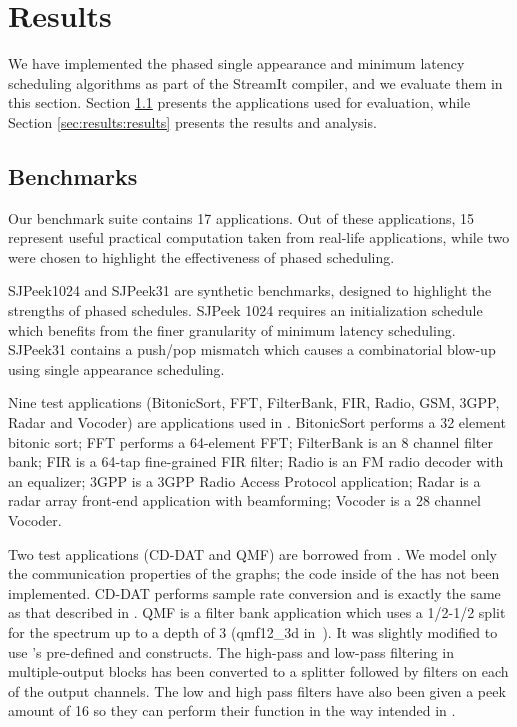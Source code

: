 \section{Results}
\label{chpt:results}

We have implemented the phased single appearance and minimum latency
scheduling algorithms as part of the StreamIt compiler, and we
evaluate them in this section.  Section \ref{sec:results:apps}
presents the applications used for evaluation, while Section
\ref{sec:results:results} presents the results and analysis.

\subsection{Benchmarks}
\label{sec:results:apps}

Our benchmark suite contains 17 applications. Out of these
applications, 15 represent useful practical computation taken from
real-life applications, while two were chosen to highlight the
effectiveness of phased scheduling.

SJPeek1024 and SJPeek31 are synthetic benchmarks, designed to
highlight the strengths of phased schedules.  SJPeek 1024 requires an
initialization schedule which benefits from the finer granularity of
minimum latency scheduling. SJPeek31 contains a push/pop mismatch
which causes a combinatorial blow-up using single appearance
scheduling.

Nine test applications (BitonicSort, FFT, FilterBank, FIR, Radio, GSM,
3GPP, Radar and Vocoder) are applications used in
\cite{Gordo02}. BitonicSort performs a 32 element bitonic sort; FFT
performs a 64-element FFT; FilterBank is an 8 channel filter bank; FIR
is a 64-tap fine-grained FIR filter; Radio is an FM radio decoder with
an equalizer; 3GPP is a 3GPP Radio Access Protocol application; Radar
is a radar array front-end application with beamforming; Vocoder is a
28 channel Vocoder.

Two test applications (CD-DAT and QMF) are borrowed from
\cite{murt2000x2}. We model only the communication properties of the
graphs; the code inside of the {\filters} has not been implemented.
CD-DAT performs sample rate conversion and is exactly the same as that
described in \cite{murt2000x2}.  QMF is a filter bank application
which uses a 1/2-1/2 split for the spectrum up to a depth of 3
(qmf12\_3d in~\cite{murt2000x2}).  It was slightly modified to use
{\StreamIt}'s pre-defined {\splitter} and {\joiner} constructs.  The
high-pass and low-pass filtering in multiple-output blocks has been
converted to a splitter followed by filters on each of the output
channels. The low and high pass filters have also been given a peek
amount of 16 so they can perform their function in the way intended in
{\StreamIt}.

